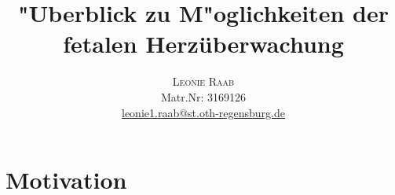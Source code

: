 \documentclass[10pt,a4paper,headinclude,twoside, plainheadsepline, open=right, numbers=noenddot, twocolumn]{article}
\begin{document}
%
\title{\vspace{-5mm}%
	\fontsize{20pt}{10pt}\selectfont
	\textbf{"Uberblick zu M"oglichkeiten der fetalen Herzüberwachung}
	}	
\vspace{-5mm}\date{}
\author{
	\large
       \begin{minipage}[t]{0.33\linewidth}
         \begin{center}
           	\textsc{Leonie Raab}\\[2mm]
                 \normalsize	Matr.Nr: 3169126\\
                 \normalsize
                 \href{leonie1.raab@st.oth-regensburg.de}
                 {leonie1.raab@st.oth-regensburg.de}      
         \end{center}
       \end{minipage}        
     }


\section{Motivation}
\label{motivation}
\end{document}
